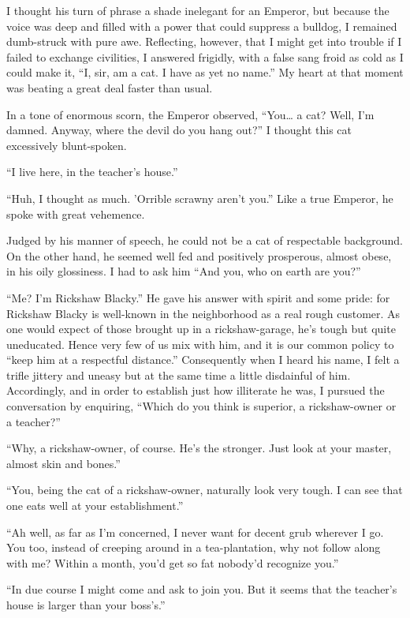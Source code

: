 \documentclass[12pt, openright]{book}
\begin{document}
I thought his turn of phrase a shade inelegant for an Emperor, but
because the voice was deep and filled with a power that could suppress a
bulldog, I remained dumb-struck with pure awe. Reflecting, however, that
I might get into trouble if I failed to exchange civilities, I answered
frigidly, with a false sang froid as cold as I could make it, ``I, sir,
am a cat. I have as yet no name.'' My heart at that moment was beating a
great deal faster than usual.

In a tone of enormous scorn, the Emperor observed, ``You\ldots{} a cat?
Well, I'm damned. Anyway, where the devil do you hang out?'' I thought
this cat excessively blunt-spoken.

``I live here, in the teacher's house.''

``Huh, I thought as much. 'Orrible scrawny aren't you.'' Like a true
Emperor, he spoke with great vehemence.

Judged by his manner of speech, he could not be a cat of respectable
background. On the other hand, he seemed well fed and positively
prosperous, almost obese, in his oily glossiness. I had to ask him ``And
you, who on earth are you?''

``Me? I'm Rickshaw Blacky.'' He gave his answer with spirit and some
pride: for Rickshaw Blacky is well-known in the neighborhood as a real
rough customer. As one would expect of those brought up in a
rickshaw-garage, he's tough but quite uneducated. Hence very few of us
mix with him, and it is our common policy to ``keep him at a respectful
distance.'' Consequently when I heard his name, I felt a trifle jittery
and uneasy but at the same time a little disdainful of him. Accordingly,
and in order to establish just how illiterate he was, I pursued the
conversation by enquiring, ``Which do you think is superior, a
rickshaw-owner or a teacher?''

``Why, a rickshaw-owner, of course. He's the stronger. Just look at your
master, almost skin and bones.''

``You, being the cat of a rickshaw-owner, naturally look very tough. I
can see that one eats well at your establishment.''

``Ah well, as far as I'm concerned, I never want for decent grub
wherever I go. You too, instead of creeping around in a tea-plantation,
why not follow along with me? Within a month, you'd get so fat nobody'd
recognize you.''

``In due course I might come and ask to join you. But it seems that the
teacher's house is larger than your boss's.''
\end{document}
